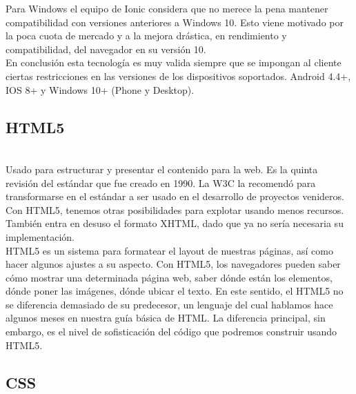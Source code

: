 \documentclass[a4paper, 11pt]{article}
\begin{document}
\begin{itemize}
              Para Windows el equipo de Ionic considera que no merece la pena mantener compatibilidad
              con versiones anteriores a Windows 10. Esto viene motivado por la poca cuota de mercado
              y a la mejora drástica, en rendimiento y compatibilidad, del navegador en su versión 10.\\

              En conclusión esta tecnología es muy valida siempre que se impongan al cliente ciertas
              restricciones en las versiones de los dispositivos soportados. Android 4.4+, IOS 8+ y
              Windows 10+ (Phone y Desktop).



        \subsection{HTML5}\\

            Usado para estructurar y presentar el contenido para la web. Es la quinta
            revisión del estándar que fue creado en 1990. La W3C la recomendó para
            transformarse en el estándar a ser usado en el desarrollo de proyectos
            venideros. Con HTML5, tenemos otras posibilidades para explotar usando
            menos recursos. También entra en desuso el formato XHTML, dado que ya no
            sería necesaria su implementación.\\

            HTML5 es un sistema para formatear el layout de nuestras páginas, así como
            hacer algunos ajustes a su aspecto. Con HTML5, los navegadores pueden
            saber cómo mostrar una determinada página web, saber dónde están los
            elementos, dónde poner las imágenes, dónde ubicar el texto. En este
            sentido, el HTML5 no se diferencia demasiado de su predecesor, un lenguaje
            del cual hablamos hace algunos meses en nuestra guía básica de HTML. La
            diferencia principal, sin embargo, es el nivel de sofisticación del código
            que podremos construir usando HTML5.

        \subsection{CSS}\\


\end{itemize}
\end{document}

